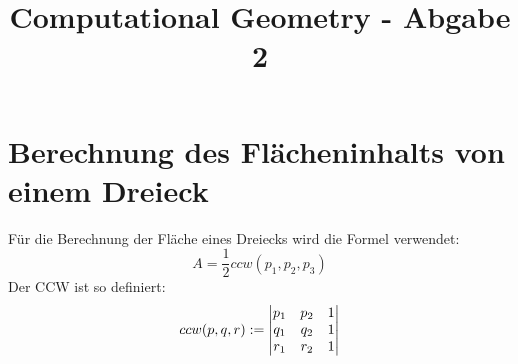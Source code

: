 \documentclass[conference]{IEEEtran}
\begin{document}
	
	\title{Computational Geometry - Abgabe 2}
	
	\author{
	}
	
	\maketitle
	
	
	\section{Berechnung des Flächeninhalts von einem Dreieck}
	Für die Berechnung der Fläche eines Dreiecks wird die Formel verwendet:
	\[ A = \frac{1}{2} ccw(p_1,p_2,p_3) \]
	Der CCW ist so definiert: 
	\[ ccw(p,q,r) := 
	\begin{vmatrix}
		p_1 & p_2 & 1 \\ 
		q_1 & q_2 & 1 \\ 
		r_1 & r_2 & 1 \notag
	\end{vmatrix} \]
	
\end{document}
